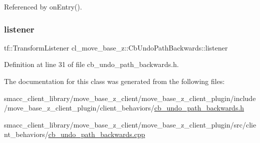 Referenced by on\+Entry().

\mbox{\label{classcl__move__base__z_1_1CbUndoPathBackwards_add2b6a0f1c19654a0cf07209fc123a71}} 
\subsubsection{\texorpdfstring{listener}{listener}}
{\footnotesize\ttfamily tf\+::\+Transform\+Listener cl\+\_\+move\+\_\+base\+\_\+z\+::\+Cb\+Undo\+Path\+Backwards\+::listener\hspace{0.3cm}{\ttfamily [private]}}



Definition at line 31 of file cb\+\_\+undo\+\_\+path\+\_\+backwards.\+h.



The documentation for this class was generated from the following files\+:\begin{DoxyCompactItemize}
\item 
smacc\+\_\+client\+\_\+library/move\+\_\+base\+\_\+z\+\_\+client/move\+\_\+base\+\_\+z\+\_\+client\+\_\+plugin/include/move\+\_\+base\+\_\+z\+\_\+client\+\_\+plugin/client\+\_\+behaviors/\hyperlink{cb__undo__path__backwards_8h}{cb\+\_\+undo\+\_\+path\+\_\+backwards.\+h}\item 
smacc\+\_\+client\+\_\+library/move\+\_\+base\+\_\+z\+\_\+client/move\+\_\+base\+\_\+z\+\_\+client\+\_\+plugin/src/client\+\_\+behaviors/\hyperlink{cb__undo__path__backwards_8cpp}{cb\+\_\+undo\+\_\+path\+\_\+backwards.\+cpp}\end{DoxyCompactItemize}
